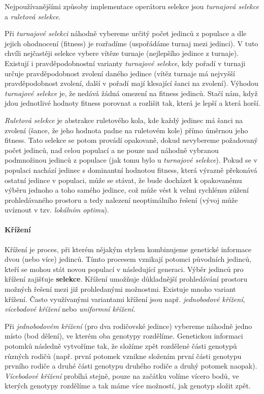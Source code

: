 Nejpoužívanějšími způsoby implementace operátoru selekce jsou \emph{turnajová
selekce} a \emph{ruletová selekce}. 

Při \emph{turnajové selekci} náhodně vybereme určitý počet jedinců z
populace a dle jejich ohodnocení (fitness) je rozřadíme (uspořádáme turnaj mezi
jedinci). V tuto chvíli nejčastěji selekce vybere vítěze turnaje (nejlepšího
jedince z turnaje). Existují i pravděpodobnostní varianty \emph{turnajové
selekce}, kdy pořadí v turnaji určuje pravděpodobnost zvolení daného jedince
(vítěz turnaje má nejvyšší pravděpodobnost zvolení, další v pořadí mají
klesající šanci na zvolení). Výhodou \emph{turnajové selekce} je, že nedává
žádná omezení na fitness jedinců. Stačí nám, když jdou jednotlivé hodnoty
fitness porovnat a rozlišit tak, která je lepší a která horší.

\emph{Ruletová selekce} je abstrakce ruletového kola, kde každý jedinec má šanci
na zvolení (šance, že jeho hodnota padne na ruletovém kole) přímo úměrnou jeho
fitness. Tato selekce se potom provádí opakovaně, dokud nevybereme požadovaný
počet jedinců, nad celou populací a ne pouze nad náhodně vybranou podmnožinou
jedinců z populace (jak tomu bylo u \emph{turnajové selekce}). Pokud se v
populaci nachází jedinec s dominantní hodnotou fitness, která výrazně překonává
ostatní jedince v populaci, může se stávat, že bude docházet k opakovanému
výběru jednoho a toho samého jedince, což může vést k velmi rychlému zúžení
prohledávaného prostoru a tedy nalezení neoptimálního řešení (vývoj může
uvíznout v tzv. \emph{lokálním optimu}).

\paragraph{Křížení}
Křížení je proces, při kterém nějakým stylem kombinujeme genetické informace
dvou (nebo více) jedinců. Tímto procesem vznikají potomci původních jedinců,
kteří se mohou stát novou populací v následující generaci. Výběr jedinců pro
křížení zajišťuje \textbf{selekce}. Křížení umožňuje důkladnější prohledávání
prostoru možných řešení mezi již prohledanými možnostmi. Existuje mnoho variant
křížení. Často využívanými variantami křížení jsou např. \emph{jednobodové
křížení}, \emph{vícebodové křížení} nebo \emph{uniformní křížení}.

Při \emph{jednobodovém křížení} (pro dva rodičovské jedince) vybereme náhodně
jedno místo (bod dělení), ve kterém oba genotypy rozdělíme. Genetickou
informaci potomků následně vytvoříme tak, že složíme zpět rozdělené části
genotypů různých rodičů (např. první potomek vznikne složením první části
genotypu prvního rodiče a druhé části genotypu druhého rodiče a druhý potomek
naopak). \emph{Vícebodové křížení} probíhá stejně, pouze na začátku volíme
vícero bodů, ve kterých genotypy rozdělíme a tak máme více možností, jak
genotyp složit zpět.

